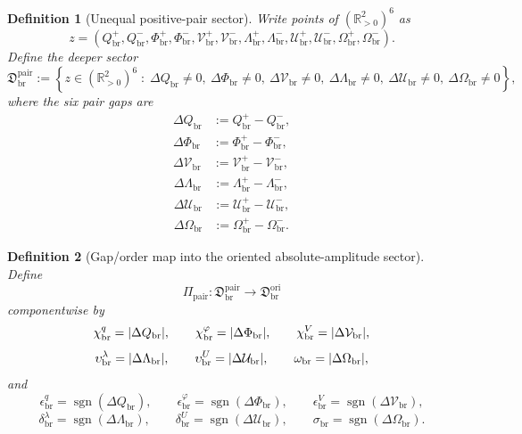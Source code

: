 \documentclass[11pt]{article}
\newcommand{\OriginSector}{\mathfrak D_{\mathrm{br}}^{\mathrm{ori}}}
\newcommand{\AbsReadAmp}{\chi_{\mathrm{br}}^{q}}
\newcommand{\AbsCovAmp}{\chi_{\mathrm{br}}^{\varphi}}
\newcommand{\AbsRelaxAmp}{\chi_{\mathrm{br}}^{V}}
\newcommand{\AbsWellAmp}{\upsilon_{\mathrm{br}}^{\lambda}}
\newcommand{\AbsEqAmp}{\upsilon_{\mathrm{br}}^{U}}
\newcommand{\AbsScaleAmp}{\omega_{\mathrm{br}}}
\newcommand{\PolRead}{\epsilon_{\mathrm{br}}^{q}}
\newcommand{\PolCov}{\epsilon_{\mathrm{br}}^{\varphi}}
\newcommand{\PolRelax}{\epsilon_{\mathrm{br}}^{V}}
\newcommand{\PolWell}{\delta_{\mathrm{br}}^{\lambda}}
\newcommand{\PolEq}{\delta_{\mathrm{br}}^{U}}
\newcommand{\PolScale}{\sigma_{\mathrm{br}}}
\newcommand{\PairSector}{\mathfrak D_{\mathrm{br}}^{\mathrm{pair}}}
\newcommand{\PairMap}{\Pi_{\mathrm{pair}}}
\newcommand{\PairReadPlus}{Q_{\mathrm{br}}^{+}}
\newcommand{\PairReadMinus}{Q_{\mathrm{br}}^{-}}
\newcommand{\PairCovPlus}{\Phi_{\mathrm{br}}^{+}}
\newcommand{\PairCovMinus}{\Phi_{\mathrm{br}}^{-}}
\newcommand{\PairRelaxPlus}{\mathcal V_{\mathrm{br}}^{+}}
\newcommand{\PairRelaxMinus}{\mathcal V_{\mathrm{br}}^{-}}
\newcommand{\PairWellPlus}{\Lambda_{\mathrm{br}}^{+}}
\newcommand{\PairWellMinus}{\Lambda_{\mathrm{br}}^{-}}
\newcommand{\PairEqPlus}{\mathcal U_{\mathrm{br}}^{+}}
\newcommand{\PairEqMinus}{\mathcal U_{\mathrm{br}}^{-}}
\newcommand{\PairScalePlus}{\Omega_{\mathrm{br}}^{+}}
\newcommand{\PairScaleMinus}{\Omega_{\mathrm{br}}^{-}}
\newcommand{\GapRead}{\Delta Q_{\mathrm{br}}}
\newcommand{\GapCov}{\Delta \Phi_{\mathrm{br}}}
\newcommand{\GapRelax}{\Delta \mathcal V_{\mathrm{br}}}
\newcommand{\GapWell}{\Delta \Lambda_{\mathrm{br}}}
\newcommand{\GapEq}{\Delta \mathcal U_{\mathrm{br}}}
\newcommand{\GapScale}{\Delta \Omega_{\mathrm{br}}}
\newtheorem{definition}{Definition}
\begin{document}
\begin{definition}[Unequal positive-pair sector]
\label{def:pairsector}
Write points of \((\mathbb R_{>0}^{2})^{6}\) as
\begin{equation}
z=
(\PairReadPlus,\PairReadMinus,\PairCovPlus,\PairCovMinus,\PairRelaxPlus,\PairRelaxMinus,
\PairWellPlus,\PairWellMinus,\PairEqPlus,\PairEqMinus,\PairScalePlus,\PairScaleMinus).
\label{eq:paircoords}
\end{equation}
Define the deeper sector
\begin{equation}
\PairSector
:=
\left\{
z\in(\mathbb R_{>0}^{2})^{6}
\;:\;
\GapRead\neq0,\ \GapCov\neq0,\ \GapRelax\neq0,\ \GapWell\neq0,\ \GapEq\neq0,\ \GapScale\neq0
\right\},
\label{eq:pairsector}
\end{equation}
where the six pair gaps are
\begin{equation}
\begin{aligned}
\GapRead&:=\PairReadPlus-\PairReadMinus,\\
\GapCov&:=\PairCovPlus-\PairCovMinus,\\
\GapRelax&:=\PairRelaxPlus-\PairRelaxMinus,
\end{aligned}
\label{eq:gapsA}
\end{equation}
\begin{equation}
\begin{aligned}
\GapWell&:=\PairWellPlus-\PairWellMinus,\\
\GapEq&:=\PairEqPlus-\PairEqMinus,\\
\GapScale&:=\PairScalePlus-\PairScaleMinus.
\end{aligned}
\label{eq:gapsB}
\end{equation}
\end{definition}

\begin{definition}[Gap/order map into the oriented absolute-amplitude sector]
\label{def:pairmap}
Define
\begin{equation}
\PairMap:\PairSector\longrightarrow\OriginSector
\label{eq:pairmap}
\end{equation}
componentwise by
\begin{equation}
\AbsReadAmp=\abs{\GapRead},
\qquad
\AbsCovAmp=\abs{\GapCov},
\qquad
\AbsRelaxAmp=\abs{\GapRelax},
\label{eq:pairabsA}
\end{equation}
\begin{equation}
\AbsWellAmp=\abs{\GapWell},
\qquad
\AbsEqAmp=\abs{\GapEq},
\qquad
\AbsScaleAmp=\abs{\GapScale},
\label{eq:pairabsB}
\end{equation}
and
\begin{equation}
\PolRead=\operatorname{sgn}(\GapRead),
\qquad
\PolCov=\operatorname{sgn}(\GapCov),
\qquad
\PolRelax=\operatorname{sgn}(\GapRelax),
\label{eq:pairpolA}
\end{equation}
\begin{equation}
\PolWell=\operatorname{sgn}(\GapWell),
\qquad
\PolEq=\operatorname{sgn}(\GapEq),
\qquad
\PolScale=\operatorname{sgn}(\GapScale).
\label{eq:pairpolB}
\end{equation}
\end{definition}
\end{document}
